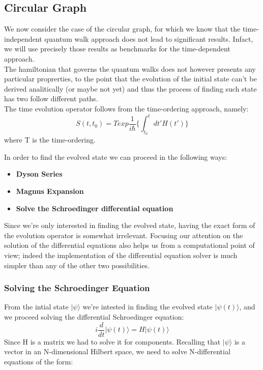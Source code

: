 \documentclass[11pt, twoside]{report}
\begin{document}
\subsection{Circular Graph}
We now consider the case of the circular graph, for which we know that the time-independent quantum walk approach does not lead to significant results. Infact, we will use precisely those results as benchmarks for the time-dependent approach.\\
The hamiltonian that governs the quantum walks does not however presents any particular proprerties, to the point that the evolution of the initial state can't be derived analitically (or maybe not yet) and thus the process of finding such state has two follow different paths. \\
The time evolution operator follows from the time-ordering approach, namely:
  \begin{equation}
    S(t,t_0) = T exp \frac{1}{i\hbar}\Big\{ \int_{t_0}^{t} dt' H(t')\Big\}
  \end{equation}
where T is the time-ordering.

\noindent
In order to find the evolved state we can proceed in the following ways:
\begin{itemize}
  \item \textbf{Dyson Series}
  \item \textbf{Magnus Expansion}
  \item \textbf{Solve the Schroedinger differential equation}
\end{itemize}
Since we're only interested in finding the evolved state, having the exact form of the evolution operator is somewhat irrelevant. Focusing our attention on the solution of the differential equations also helps us from a computational point of view; indeed the implementation of the differential equation solver is much simpler than any of the other two possibilities.

\subsubsection*{Solving the Schroedinger Equation}
From the intial state $|\psi\rangle$ we're intested in finding the evolved state $|\psi(t)\rangle$, and we proceed solving the differential Schroedinger equation:
  \begin{equation}
    i\frac{d}{dt}|\psi(t)\rangle = H |\psi(t)\rangle
  \end{equation}
Since H is a matrix we had to solve it for components. Recalling that $|\psi\rangle$ is a vector in an N-dimensional Hilbert space, we need to solve N-differential equations of the form:
\end{document}
